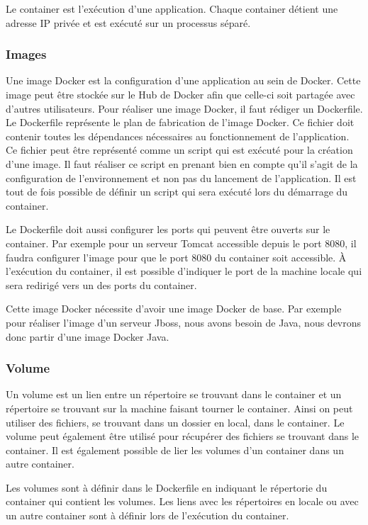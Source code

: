 Le container est l’exécution d'une application. Chaque container détient une adresse IP privée et est exécuté sur un processus séparé.


\subsubsection{Images}

Une image Docker est la configuration d'une application au sein de Docker. Cette image peut être stockée sur le Hub de Docker afin que celle-ci soit partagée avec d'autres utilisateurs. Pour réaliser une image Docker, il faut rédiger un Dockerfile. Le Dockerfile représente le plan de fabrication de l'image Docker. Ce fichier doit contenir toutes les dépendances nécessaires au fonctionnement de l'application. Ce fichier peut être représenté comme un script qui est exécuté pour la création d'une image. Il faut réaliser ce script en prenant bien en compte qu'il s'agit de la configuration de l'environnement et non pas du lancement de l'application. Il est tout de fois possible de définir un script qui sera exécuté lors du démarrage du container.

Le Dockerfile doit aussi configurer les ports qui peuvent être ouverts sur le container. Par exemple pour un serveur Tomcat accessible depuis le port 8080, il faudra configurer l'image pour que le port 8080 du container soit accessible. À l'exécution du container, il est possible d'indiquer le port de la machine locale qui sera redirigé vers un des ports du container.

Cette image Docker nécessite d'avoir une image Docker de base. Par exemple pour réaliser l'image d'un serveur Jboss, nous avons besoin de Java, nous devrons donc partir d'une image Docker Java.


\subsubsection{Volume}

Un volume est un lien entre un répertoire se trouvant dans le container et un répertoire se trouvant sur la machine faisant tourner le container. Ainsi on peut utiliser des fichiers, se trouvant dans un dossier en local, dans le container. Le volume peut également être utilisé pour récupérer des fichiers se trouvant dans le container. Il est également possible de lier les volumes d'un container dans un autre container.

Les volumes sont à définir dans le Dockerfile en indiquant le répertorie du container qui contient les volumes. Les liens avec les répertoires en locale ou avec un autre container sont à définir lors de l'exécution du container.

